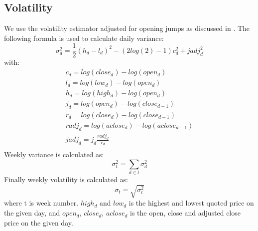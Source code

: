 \subsection*{Volatility}
We use the \cite{garman} volatility estimator adjusted for opening jumps as discussed in \cite{molnar_volatility}.
The following formula is used to calculate daily variance:
\begin{equation}
   \label{w_volatility} 
    \sigma^2_{d} = \frac{1}{2}(h_d-l_d)^2-(2log(2)-1)c_d^2+jadj_d^2
\end{equation}
with:
\begin{equation}
\begin{split}
c_{d} = log(close_{d})-log(open_{d}) \\
l_{d} = log(low_{d})-log(open_{d}) \\
h_{d} = log(high_{d})-log(open_{d}) \\
j_{d} = log(open_{d})-log(close_{d-1}) \\
r_{d} = log(close_{d})-log(close_{d-1}) \\
radj_{d} = log(aclose_{d})-log(aclose_{d-1}) \\
jadj_{d} = j_{d} \frac{radj_{d}}{r_{d}} \\
\end{split}
\end{equation}
Weekly variance is calculated as:
\begin{equation}
   \label{w_volatility} 
    \sigma^2_{t} = \sum_{d \in t} \sigma^2_{d} 
\end{equation}
Finally weekly volatility is calculated as:
\begin{equation}
   \label{w_volatility} 
    \sigma_t = \sqrt{\sigma^2_t}
\end{equation}
 where t is week number. $high_{d}$ and $low_{d}$ is the highest and lowest quoted price on the given day, and $open_{d}$, $close_{d}$, $aclose_{d}$ is the open, close and adjusted close price on the given day. 

